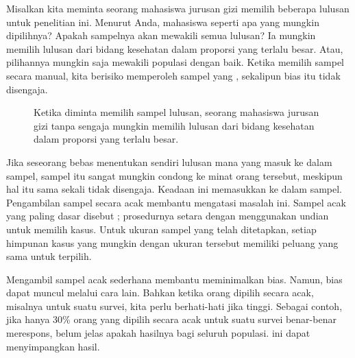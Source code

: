 \begin{examplewrap}
\begin{nexample}{Misalkan kita meminta seorang mahasiswa jurusan gizi
    memilih beberapa lulusan untuk penelitian ini.
    Menurut Anda, mahasiswa seperti apa yang mungkin dipilihnya?
    Apakah sampelnya akan mewakili semua lulusan?}
  Ia mungkin memilih lulusan dari bidang kesehatan dalam proporsi yang
  terlalu besar. Atau, pilihannya mungkin saja mewakili populasi dengan baik.
  Ketika memilih sampel secara manual, kita berisiko memperoleh sampel yang
  , sekalipun bias itu tidak disengaja.
\end{nexample}
\end{examplewrap}

\begin{figure}
  \centering
  \caption{Ketika diminta memilih sampel lulusan,
      seorang mahasiswa jurusan gizi tanpa sengaja mungkin memilih
      lulusan dari bidang kesehatan dalam proporsi yang terlalu besar.}
  \label{popToSubSampleGraduates}
\end{figure}

Jika seseorang bebas menentukan sendiri lulusan mana yang masuk ke dalam
sampel, sampel itu sangat mungkin condong ke minat orang tersebut, meskipun
hal itu sama sekali tidak disengaja.
Keadaan ini memasukkan  ke dalam sampel.
Pengambilan sampel secara acak membantu mengatasi masalah ini.
Sampel acak yang paling dasar disebut
; prosedurnya setara dengan menggunakan
undian untuk memilih kasus. Untuk ukuran sampel yang telah ditetapkan,
setiap himpunan kasus yang mungkin dengan ukuran tersebut memiliki peluang
yang sama untuk terpilih.

Mengambil sampel acak sederhana membantu meminimalkan bias.
Namun, bias dapat muncul melalui cara lain.
Bahkan ketika orang dipilih secara acak, misalnya untuk suatu survei,
kita perlu berhati-hati jika
 tinggi.
Sebagai contoh, jika hanya 30\% orang yang dipilih secara acak untuk suatu
survei benar-benar merespons, belum jelas apakah hasilnya
 bagi seluruh populasi.
 ini dapat menyimpangkan hasil.

